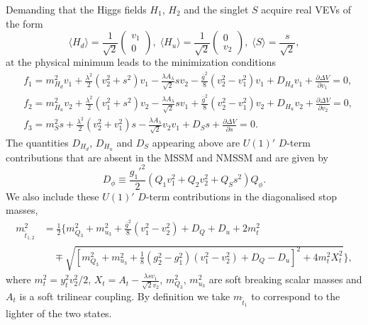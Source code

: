 \documentclass[preprint,amsmath,amssymb,aps,superscriptaddress,prd,
showpacs,floatfix,nofootinbib]{revtex4-1}
\begin{document}
Demanding that the Higgs fields $H_1$, $H_2$ and the singlet $S$ acquire real
VEVs of the form
\begin{equation} \label{eq:E6vevs}
\langle H_d \rangle = \frac{1}{\sqrt{2}} \begin{pmatrix} v_1 \\ 0
\end{pmatrix} , \;
\langle H_u \rangle = \frac{1}{\sqrt{2}} \begin{pmatrix} 0 \\ v_2
\end{pmatrix} , \;
\langle S \rangle =\frac{s}{\sqrt{2}} ,
\end{equation}
at the physical minimum leads to the minimization conditions
\begin{subequations} \label{eq:E6EWSBConditions}
\begin{align}
&f_1 = m_{H_d}^2 v_1 + \frac{\lambda^2}{2} (v_2^2 + s^2) v_1-
\frac{\lambda A_\lambda}{\sqrt{2}} s v_2 - \frac{\bar{g}^2}{8}
(v_2^2 - v_1^2) v_1 + D_{H_d} v_1 + \frac{\partial \Delta V}{\partial v_1} = 0 ,
\label{eq:E6EWSBcondition1} \\
&f_2 = m_{H_u}^2 v_2 + \frac{\lambda^2}{2} (v_1^2 + s^2) v_2 -
\frac{\lambda A_\lambda}{\sqrt{2}} s v_1 + \frac{\bar{g}^2}{8}
(v_2^2 - v_1^2) v_2 + D_{H_u} v_2 + \frac{\partial \Delta V}{\partial v_2} = 0 ,
\label{eq:E6EWSBcondition2} \\
&f_3 = m_S^2 s + \frac{\lambda^2}{2} (v_2^2 + v_1^2) s -
\frac{\lambda A_\lambda}{\sqrt{2}} v_2 v_1 + D_S s +
\frac{\partial \Delta V}{\partial s} = 0 . \label{eq:E6EWSBcondition3}
\end{align}
\end{subequations}
The quantities $D_{H_d}$, $D_{H_u}$ and $D_S$ appearing above are $U(1)'$
$D$-term contributions that are absent in the MSSM and NMSSM and are given by
\begin{equation} \label{eq:E6Dterms}
D_\phi \equiv \frac{g_1'^2}{2} \left (Q_1 v_1^2 + Q_2 v_2^2 + Q_S s^2
\right ) Q_\phi .
\end{equation}
We also include these $U(1)'$ $D$-term contributions in the diagonalised stop
masses,
\begin{align}
m_{\tilde{t}_{1,2}}^2 &= \frac{1}{2} \bigg \{ m_{Q_3}^2 + m_{u_3}^2 +
\frac{\bar{g}^2}{8} \left ( v_1^2 - v_2^2 \right ) + D_Q + D_u + 2 m_t^2
\nonumber \\
& \quad {} \mp \sqrt{\left [ m_{Q_3}^2 + m_{u_3}^2 + \frac{1}{8} \left (g_2^2
- g_1^2 \right ) \left (v_1^2 - v_2^2 \right ) + D_Q - D_u \right ]^2 +
4 m_t^2 X_t^2} \bigg \} ,
\end{align}
where $m_t^2 = y_t^2 v_2^2 / 2$, $X_t = A_t -
\frac{\lambda s v_1}{\sqrt{2} v_2}$, $m_{Q_3}^2$, $m_{u_3}^2$ are soft
breaking scalar masses and $A_t$ is a soft trilinear coupling.  By definition
we take $m_{\tilde{t}_1}$ to correspond to the lighter of the two states.
\end{document}

